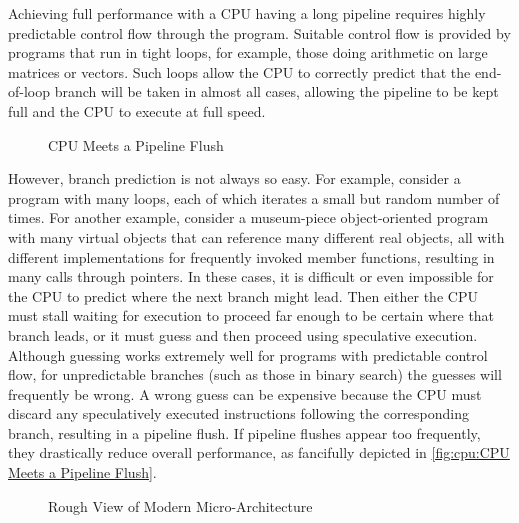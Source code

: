 Achieving full performance with a CPU having a long pipeline requires
highly predictable control flow through the program.
Suitable control flow is provided by programs that run in tight loops,
for example, those doing arithmetic on large matrices or vectors.
Such loops allow the CPU to correctly predict that the end-of-loop branch
will be taken in almost all cases, allowing the pipeline to be kept full
and the CPU to execute at full speed.

\begin{figure}
\centering
{}
\caption{CPU Meets a Pipeline Flush}
\end{figure}

However, branch prediction is not always so easy.
For example, consider a program with many loops, each of which iterates
a small but random number of times.
For another example, consider a museum-piece object-oriented program with
many virtual objects that can reference many different real objects, all
with different implementations for frequently invoked member functions,
resulting in many calls through pointers.
In these cases, it is difficult or even
impossible for the CPU to predict where the next branch might lead.
Then either the CPU must stall waiting for execution to proceed far
enough to be certain where that branch leads, or it must guess and
then proceed using speculative execution.
Although guessing works extremely well for programs with predictable
control flow, for unpredictable branches (such as those in binary search)
the guesses will frequently be wrong.
A wrong guess can be expensive because the CPU must discard any
speculatively executed instructions following the corresponding
branch, resulting in a pipeline flush.
If pipeline flushes appear too frequently, they drastically reduce
overall performance, as fancifully depicted in
\cref{fig:cpu:CPU Meets a Pipeline Flush}.

\begin{figure}
\centering
{}
\caption{Rough View of Modern Micro-Architecture}
\label{fig:cpu:Rough View of Modern Micro-Architecture}
\end{figure}

